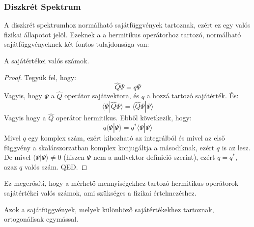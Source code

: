 \documentclass[../main.tex]{subfiles}
\begin{document}
\subsubsection*{Diszkrét Spektrum}
A diszkrét spektrumhoz normálható sajátfüggvények tartoznak, ezért ez egy valós fizikai állapotot jelöl. Ezeknek a a hermitikus operátorhoz tartozó, normálható sajátfüggvényeknek két fontos tulajdonsága van:
\begin{theorem}
    A sajátértékei valós számok.
\end{theorem}
\begin{proof}
    Tegyük fel, hogy:
    \begin{equation}
        \hat{Q} \Psi = q \Psi
    \end{equation}
    Vagyis, hogy $\Psi$ a $\hat{Q}$ operátor sajátvektora, és $q$ a hozzá tartozó sajátérték. És:
    \begin{equation}
        \langle \Psi | \hat{Q} \Psi \rangle = \langle \hat{Q} \Psi | \Psi \rangle
    \end{equation}
    Vagyis hogy a $\hat{Q}$ operátor hermitikus. Ebből következik, hogy:
    \begin{equation}
       q \langle \Psi | \Psi \rangle = q^* \langle \Psi | \Psi \rangle
    \end{equation}
    Mivel $q$ egy komplex szám, ezért kihozható az integrálból és mivel az első függvény a skalárszorzatban komplex konjugáltja a másodiknak, ezért $q$ is az lesz. De mivel $\langle \Psi | \Psi \rangle \neq 0$ (hiszen $\Psi$ nem a nullvektor defínició szerint), ezért $q = q^*$, azaz $q$ valós szám. QED.
\end{proof}
Ez megerősíti, hogy a mérhető mennyiségekhez tartozó hermitikus operátorok sajátértékei valós számok, ami szükséges a fizikai értelmezéshez.
\begin{theorem}
    Azok a sajátfüggvények, melyek különböző sajátértékekhez tartoznak, ortogonálisak egymással.
\end{theorem}
\end{document}
